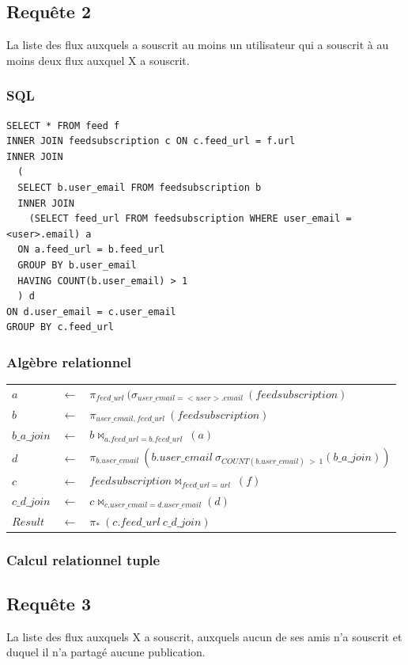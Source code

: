 \documentclass[a4paper,10pt]{article}
\begin{document}
\subsection{Requête 2}
La liste des flux auxquels a souscrit au moins un utilisateur qui a souscrit à au moins deux flux auxquel X
a souscrit.
\subsubsection{SQL}
\begin{lstlisting}
SELECT * FROM feed f
INNER JOIN feedsubscription c ON c.feed_url = f.url
INNER JOIN 
  (
  SELECT b.user_email FROM feedsubscription b 
  INNER JOIN 
    (SELECT feed_url FROM feedsubscription WHERE user_email = <user>.email) a
  ON a.feed_url = b.feed_url 
  GROUP BY b.user_email
  HAVING COUNT(b.user_email) > 1
  ) d
ON d.user_email = c.user_email
GROUP BY c.feed_url
\end{lstlisting}
\subsubsection{Algèbre relationnel}
\begin{center}
\begin{tabular}{lll}
$a$		& $\leftarrow$ & $ \pi_{feed\_url}\ (\sigma_{user\_email=<user>.email}\ (feedsubscription)$\\
$b$		& $\leftarrow$ & $ \pi_{user\_email, feed\_url}\ (feedsubscription)$\\
$b\_a\_join$	& $\leftarrow$ & $ b \Join_{a.feed\_url=b.feed\_url}\ (a)$\\
$d$		& $\leftarrow$ & $ \pi_{b.user\_email}\ (b.user\_email\ \sigma_{COUNT(b.user\_email)\ >\ 1} (b\_a\_join))$\\
$c$		& $\leftarrow$ & $ feedsubscription \Join_{feed\_url=url}\ (f)$\\
$c\_d\_join$	& $\leftarrow$ & $ c \Join_{c.user\_email=d.user\_email} (d)$\\
$Result$	& $\leftarrow$ & $ \pi_*\ (c.feed\_url\ c\_d\_join)$
\end{tabular}
\end{center}

\subsubsection{Calcul relationnel tuple}
\clearpage
\subsection{Requête 3}
La liste des flux auxquels X a souscrit, auxquels aucun de ses amis n’a souscrit et duquel il n’a partagé
aucune publication.
\end{document}
